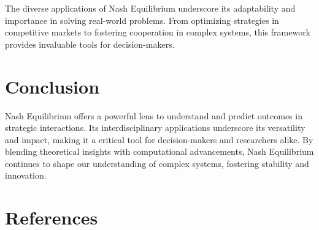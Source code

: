 \documentclass[12pt]{article}
\begin{document}
The diverse applications of Nash Equilibrium underscore its adaptability and importance in solving real-world problems. From optimizing strategies in competitive markets to fostering cooperation in complex systems, this framework provides invaluable tools for decision-makers.

\section{Conclusion}
\large Nash Equilibrium offers a powerful lens to understand and predict outcomes in strategic interactions. Its interdisciplinary applications underscore its versatility and impact, making it a critical tool for decision-makers and researchers alike. By blending theoretical insights with computational advancements, Nash Equilibrium continues to shape our understanding of complex systems, fostering stability and innovation.

\section{References}





\end{document}
